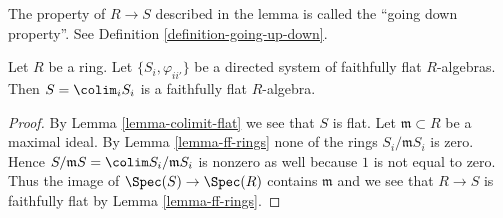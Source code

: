 \noindent
The property of $R \to S$ described in the lemma is called the
``going down property''. See Definition \ref{definition-going-up-down}.

\begin{lemma}
\label{lemma-colimit-faithfully-flat}
Let $R$ be a ring. Let $\{S_i, \varphi_{ii'}\}$ be a directed system of
faithfully flat $R$-algebras. Then $S = \colim_i S_i$ is a faithfully flat
$R$-algebra.
\end{lemma}

\begin{proof}
By Lemma \ref{lemma-colimit-flat} we see that $S$ is flat.
Let $\mathfrak m \subset R$ be a maximal ideal. By
Lemma \ref{lemma-ff-rings}
none of the rings $S_i/\mathfrak m S_i$ is zero.
Hence $S/\mathfrak mS = \colim S_i/\mathfrak mS_i$ is nonzero
as well because $1$ is not equal to zero. Thus the image of
$\Spec(S) \to \Spec(R)$ contains $\mathfrak m$ and we see that $R \to S$
is faithfully flat by Lemma \ref{lemma-ff-rings}.
\end{proof}





